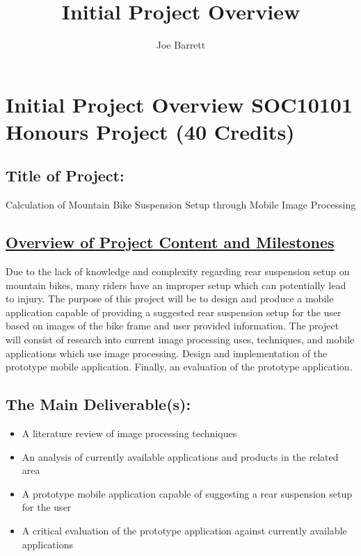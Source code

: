 \documentclass[a4paper, 12pt]{article}
\title{Initial Project Overview}
\author{Joe Barrett}
\begin{document}
	\setcounter{secnumdepth}{-1}
	\section[Heading]{\Large Initial Project Overview
			\newline
			SOC10101 Honours Project (40 Credits)
	}
	
	\subsection[Title]{Title of Project:}
	Calculation of Mountain Bike Suspension Setup through Mobile Image Processing
	
	\subsection[Overview]{\underline{Overview of Project Content and Milestones}}
	Due to the lack of knowledge and complexity regarding rear suspension setup on mountain bikes, many riders have an improper setup which can potentially lead to injury. The purpose of this project will be to design and produce a mobile application capable of providing a suggested rear suspension setup for the user based on images of the bike frame and user provided information.
	\newline\newline
	The project will consist of research into current image processing uses, techniques, and mobile applications which use image processing. Design and implementation of the prototype mobile application. Finally, an evaluation of the prototype application.
	
	\subsection[Deliverables]{The Main Deliverable(s):}
	\begin{itemize}
		\item A literature review of image processing techniques
		\item An analysis of currently available applications and products in the related area
		\item A prototype mobile application capable of suggesting a rear suspension setup for the user
		\item A critical evaluation of the prototype application against currently available applications
	\end{itemize}
	
\end{document}
